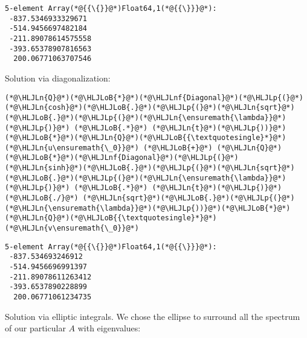 \documentclass[12pt,a4paper]{article}
\newcommand{\HLJLn}[1]{#1}
\newcommand{\HLJLnf}[1]{\textcolor[RGB]{66,102,213}{#1}}
\newcommand{\HLJLoB}[1]{\textcolor[RGB]{102,102,102}{\textbf{#1}}}
\newcommand{\HLJLp}[1]{#1}
\begin{document}
\begin{lstlisting}
5-element Array(*@{{\{}}@*)Float64,1(*@{{\}}}@*):
 -837.5346933329671
 -514.9456697482184
 -211.89078614575558
 -393.65378907816563
  200.06771063707546
\end{lstlisting}


Solution via diagonalization:


\begin{lstlisting}
(*@\HLJLn{Q}@*)(*@\HLJLoB{*}@*)(*@\HLJLnf{Diagonal}@*)(*@\HLJLp{(}@*)(*@\HLJLn{cosh}@*)(*@\HLJLoB{.}@*)(*@\HLJLp{(}@*)(*@\HLJLn{sqrt}@*)(*@\HLJLoB{.}@*)(*@\HLJLp{(}@*)(*@\HLJLn{\ensuremath{\lambda}}@*)(*@\HLJLp{)}@*) (*@\HLJLoB{.*}@*) (*@\HLJLn{t}@*)(*@\HLJLp{))}@*)(*@\HLJLoB{*}@*)(*@\HLJLn{Q}@*)(*@\HLJLoB{{\textquotesingle}*}@*)(*@\HLJLn{u\ensuremath{\_0}}@*) (*@\HLJLoB{+}@*) (*@\HLJLn{Q}@*)(*@\HLJLoB{*}@*)(*@\HLJLnf{Diagonal}@*)(*@\HLJLp{(}@*)(*@\HLJLn{sinh}@*)(*@\HLJLoB{.}@*)(*@\HLJLp{(}@*)(*@\HLJLn{sqrt}@*)(*@\HLJLoB{.}@*)(*@\HLJLp{(}@*)(*@\HLJLn{\ensuremath{\lambda}}@*)(*@\HLJLp{)}@*) (*@\HLJLoB{.*}@*) (*@\HLJLn{t}@*)(*@\HLJLp{)}@*) (*@\HLJLoB{./}@*) (*@\HLJLn{sqrt}@*)(*@\HLJLoB{.}@*)(*@\HLJLp{(}@*)(*@\HLJLn{\ensuremath{\lambda}}@*)(*@\HLJLp{))}@*)(*@\HLJLoB{*}@*)(*@\HLJLn{Q}@*)(*@\HLJLoB{{\textquotesingle}*}@*)(*@\HLJLn{v\ensuremath{\_0}}@*)
\end{lstlisting}

\begin{lstlisting}
5-element Array(*@{{\{}}@*)Float64,1(*@{{\}}}@*):
 -837.534693246912
 -514.9456696991397
 -211.89078611263412
 -393.6537890228899
  200.06771061234735
\end{lstlisting}


Solution via elliptic integrals. We chose the ellipse to surround all the spectrum of our particular $A$ with eigenvalues:
\end{document}
